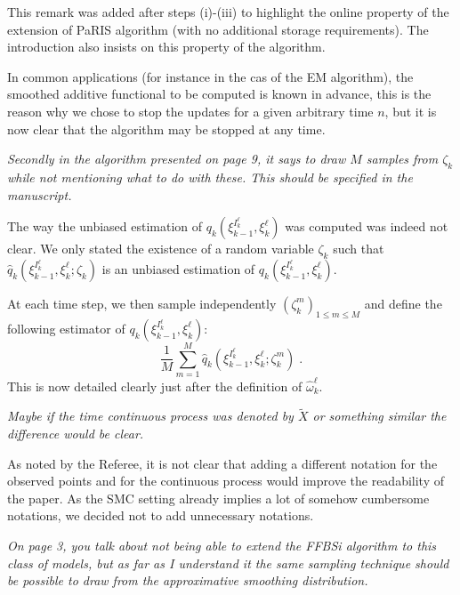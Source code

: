 \documentclass[12pt]{article}
\newcommand{\eqsp}{\;}
\newcommand{\1}{\mathrm{1}}
\begin{document}
This remark was added after steps (i)-(iii) to highlight the online property of the extension of PaRIS algorithm (with no additional storage requirements). The introduction also insists on this property of the algorithm.

In common applications (for instance in the cas of the EM algorithm),  the smoothed additive functional to be computed is known in advance, this is the reason why we chose to stop the updates for a given arbitrary time $n$, but it is now clear that the algorithm may be stopped at any time.

\vspace{1cm}

{\em Secondly in the algorithm presented on page 9, it says to draw $M$ samples from $\zeta_k$ while not mentioning
what to do with these. This should be specified in the manuscript.}

\vspace{.3cm}

The way the unbiased estimation of $q_k(\xi^{I_k^\ell}_{k-1},\xi^\ell_k)$ was computed was indeed not clear. We only stated the existence of a random variable $\zeta_k$ such that $\widehat{q}_k(\xi^{I_k^\ell}_{k-1},\xi^\ell_k;\zeta_k)$ is an unbiased estimation of $q_k(\xi^{I_k^\ell}_{k-1},\xi^\ell_k)$. 

At each time step, we then sample independently $(\zeta^m_k)_{1\le m \le M}$ and define the following estimator of $q_k(\xi^{I_k^\ell}_{k-1},\xi^\ell_k)$:
\[
\frac{1}{M}\sum_{m=1}^M \widehat{q}_k(\xi^{I_k^\ell}_{k-1},\xi^\ell_k;\zeta^m_k)\eqsp.
\]
This is now detailed clearly just after the definition of $\widehat{\omega}_k^\ell$.

\vspace{1cm}


{\em Maybe if the time continuous process was denoted by $\widetilde{X}$ or something similar the difference would be clear.}

\vspace{.3cm}

As noted by the Referee, it is not clear that adding a different notation for the observed points and for the continuous process would improve the readability of the paper. As the SMC setting already implies a lot of somehow cumbersome notations, we decided not to add unnecessary notations.

\vspace{1cm}

{\em
On page 3, you talk about not being able to extend the FFBSi algorithm to this class of models, but
as far as I understand it the same sampling technique should be possible to draw from the approximative
smoothing distribution.
}
\end{document}
